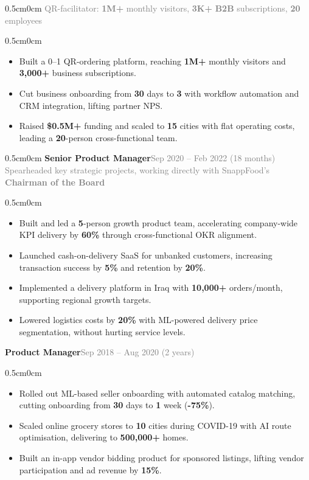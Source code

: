 \documentclass[a4paper,10pt]{article}
\newcommand{\info}[1]{#1}
\newcommand{\RoleStyle}{\fontsize{12}{14}\selectfont\bfseries}
\newcommand{\BodyStyle}{\fontsize{10}{12}\selectfont}
\newcommand{\position}[1]{{\RoleStyle \info{#1}}}\vspace{0.05em}
\newcommand{\bulletitem}[1]{\item {\BodyStyle \info{#1}}\vspace{0.1em}}
\newcommand{\graytext}[1]{\textcolor{grey}{\info{#1}}}
\newcommand{\kpi}[1]{\textbf{#1}}
\begin{document}
{\begin{adjustwidth}{0.5cm}{0cm}
{\small\graytext{\info{QR-facilitator: \kpi{1M+} monthly visitors, \kpi{3K+} \textbf{B2B} subscriptions, \textbf{20} employees}}}
\normalsize
\begin{adjustwidth}{0.5cm}{0cm}
\begin{itemize}
  \bulletitem{Built a 0--1 QR-ordering platform, reaching \kpi{1M+} monthly visitors and \kpi{3,000+} business subscriptions.}
  \bulletitem{Cut business onboarding from \kpi{30} days to \kpi{3} with workflow automation and CRM integration, lifting partner NPS.}
  \bulletitem{Raised \kpi{\$0.5M+} funding and scaled to \kpi{15} cities with flat operating costs, leading a \kpi{20}-person cross-functional team.}
\end{itemize}
\end{adjustwidth}
\end{adjustwidth}
\vspace{3pt}
\begin{adjustwidth}{0.5cm}{0cm}
{{\position{\info{Senior Product Manager}}}\hfill {\large\graytext{\info{Sep 2020 – Feb 2022 (18 months)}}}}
\\
{\small\graytext{\info{Spearheaded key strategic projects, working directly with SnappFood's \textbf{Chairman of the Board}}}}
\normalsize
\begin{adjustwidth}{0.5cm}{0cm}
\begin{itemize}
  \bulletitem{Built and led a \kpi{5}-person growth product team, accelerating company-wide KPI delivery by \kpi{60\%} through cross-functional OKR alignment.}
  \bulletitem{Launched cash-on-delivery SaaS for unbanked customers, increasing transaction success by \kpi{5\%} and retention by \kpi{20\%}.}
  \bulletitem{Implemented a delivery platform in Iraq with \kpi{10,000+} orders/month, supporting regional growth targets.}
  \bulletitem{Lowered logistics costs by \kpi{20\%} with ML-powered delivery price segmentation, without hurting service levels.}
\end{itemize}
\end{adjustwidth}
\vspace{3pt}
{{\position{\info{Product Manager}}}\hfill \large\graytext{\info{Sep 2018 – Aug 2020 (2 years)}}}
\normalsize
\begin{adjustwidth}{0.5cm}{0cm}
\begin{itemize}
  \bulletitem{Rolled out ML-based seller onboarding with automated catalog matching, cutting onboarding from \kpi{30} days to \kpi{1} week (\kpi{-75\%}).}
  \bulletitem{Scaled online grocery stores to \kpi{10} cities during COVID-19 with AI route optimisation, delivering to \kpi{500,000+} homes.}
 \bulletitem{Built an in-app vendor bidding product for sponsored listings, lifting vendor participation and ad revenue by \kpi{15\%}.}
\end{itemize}
\end{adjustwidth}
\end{adjustwidth}
\vspace{3pt}

}
\end{document}
